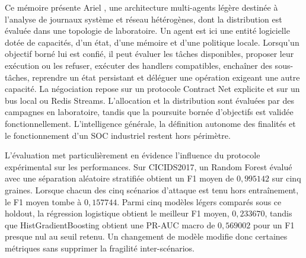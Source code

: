 
Ce mémoire présente Ariel \logminer{}, une architecture multi-agents légère
destinée à l'analyse de journaux système et réseau hétérogènes, dont la
distribution est évaluée dans une topologie de laboratoire. Un agent est ici
une entité logicielle dotée de capacités, d'un état, d'une mémoire et d'une
politique locale. Lorsqu'un objectif borné lui est confié, il peut évaluer les
tâches disponibles, proposer leur exécution ou les refuser, exécuter des
handlers compatibles, enchaîner des sous-tâches, reprendre un état persistant
et déléguer une opération exigeant une autre capacité. La négociation repose
sur un protocole Contract Net explicite et sur un bus local ou Redis Streams.
L'allocation et la distribution sont évaluées par des campagnes en laboratoire,
tandis que la poursuite bornée d'objectifs est validée fonctionnellement.
L'intelligence générale, la définition autonome des finalités et le
fonctionnement d'un SOC industriel restent hors périmètre.

L'évaluation met particulièrement en évidence l'influence du protocole
expérimental sur les performances. Sur CICIDS2017, un Random Forest évalué
avec une séparation aléatoire stratifiée obtient un F1 moyen de
$0{,}995142$ sur cinq graines. Lorsque chacun des cinq scénarios d'attaque
est tenu hors entraînement, le F1 moyen tombe à $0{,}157744$. Parmi cinq
modèles légers comparés sous ce holdout, la régression logistique obtient
le meilleur F1 moyen, $0{,}233670$, tandis que HistGradientBoosting obtient
une PR-AUC macro de $0{,}569002$ pour un F1 presque nul au seuil retenu. Un
changement de modèle modifie donc certaines métriques sans supprimer la
fragilité inter-scénarios.

